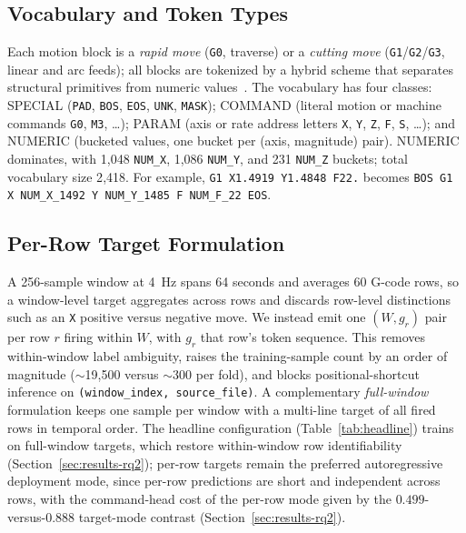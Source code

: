 \documentclass[conference]{IEEEtran}
\begin{document}
\subsection{Vocabulary and Token Types}
\label{sec:problem-vocab}

Each motion block is a \emph{rapid move} (\texttt{G0}, traverse) or a \emph{cutting move} (\texttt{G1}/\texttt{G2}/\texttt{G3}, linear and arc feeds); all blocks are tokenized by a hybrid scheme that separates structural primitives from numeric values~\cite{grammar_paper,gcode_foundational}. The vocabulary has four classes: SPECIAL (\texttt{PAD}, \texttt{BOS}, \texttt{EOS}, \texttt{UNK}, \texttt{MASK}); COMMAND (literal motion or machine commands \texttt{G0}, \texttt{M3}, \ldots); PARAM (axis or rate address letters \texttt{X}, \texttt{Y}, \texttt{Z}, \texttt{F}, \texttt{S}, \ldots); and NUMERIC (bucketed values, one bucket per (axis, magnitude) pair). NUMERIC dominates, with 1{,}048 \texttt{NUM\_X}, 1{,}086 \texttt{NUM\_Y}, and 231 \texttt{NUM\_Z} buckets; total vocabulary size 2{,}418. For example, \texttt{G1 X1.4919 Y1.4848 F22.} becomes \texttt{BOS G1 X NUM\_X\_1492 Y NUM\_Y\_1485 F NUM\_F\_22 EOS}.

\subsection{Per-Row Target Formulation}
\label{sec:per-row}

A 256-sample window at 4~Hz spans 64 seconds and averages 60 G-code rows, so a window-level target aggregates across rows and discards row-level distinctions such as an \texttt{X} positive versus negative move. We instead emit one $(W, g_r)$ pair per row $r$ firing within $W$, with $g_r$ that row's token sequence. This removes within-window label ambiguity, raises the training-sample count by an order of magnitude ($\sim$19{,}500 versus $\sim$300 per fold), and blocks positional-shortcut inference on \texttt{(window\_index, source\_file)}. A complementary \emph{full-window} formulation keeps one sample per window with a multi-line target of all fired rows in temporal order. The headline configuration (Table~\ref{tab:headline}) trains on full-window targets, which restore within-window row identifiability (Section~\ref{sec:results-rq2}); per-row targets remain the preferred autoregressive deployment mode, since per-row predictions are short and independent across rows, with the command-head cost of the per-row mode given by the $0.499$-versus-$0.888$ target-mode contrast (Section~\ref{sec:results-rq2}).
\end{document}
